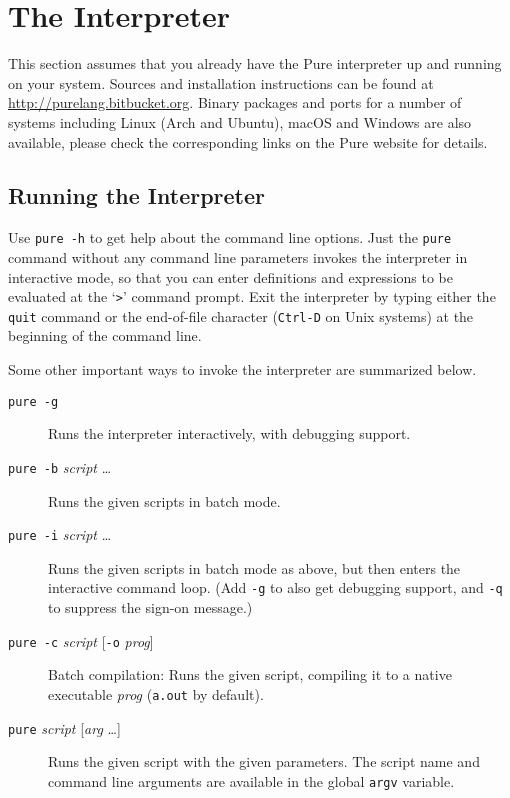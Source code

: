 \documentclass[a4paper,12pt]{article}
\newcommand{\nt}[1]{\textrm{\textit{#1\/}}}
\begin{document}
\section{The Interpreter}
\label{Interpreter}

This section assumes that you already have the Pure interpreter up and running on your system. Sources and installation instructions can be found at \url{http://purelang.bitbucket.org}. Binary packages and ports for a number of systems including Linux (Arch and Ubuntu), macOS and Windows are also available, please check the corresponding links on the Pure website for details.

\subsection{Running the Interpreter}

Use \verb|pure -h| to get help about the command line options. Just the \verb|pure| command without any command line parameters invokes the interpreter in interactive mode, so that you can enter definitions and expressions to be evaluated at the `\verb|>|' command prompt. Exit the interpreter by typing either the \verb|quit| command or the end-of-file character (\verb|Ctrl-D| on Unix systems) at the beginning of the command line.

Some other important ways to invoke the interpreter are summarized below.

\begin{description}
\item[\rm\texttt{pure -g}] Runs the interpreter interactively, with debugging support.
\item[\rm\texttt{pure -b} \nt{script} \ldots] Runs the given scripts in batch mode.
\item[\rm\texttt{pure -i} \nt{script} \ldots] Runs the given scripts in batch mode as above, but then enters the interactive command loop. (Add \texttt{-g} to also get debugging support, and \texttt{-q} to suppress the sign-on message.)
\item[\rm\texttt{pure -c} \nt{script} {[\texttt{-o} \nt{prog}]}] Batch compilation: Runs the given script, compiling it to a native executable \nt{prog} (\texttt{a.out} by default).
\item[\rm\texttt{pure} \nt{script} {[\nt{arg} \ldots]}] Runs the given script with the given parameters. The script name and command line arguments are available in the global \verb|argv| variable.
\end{description}
\end{document}
